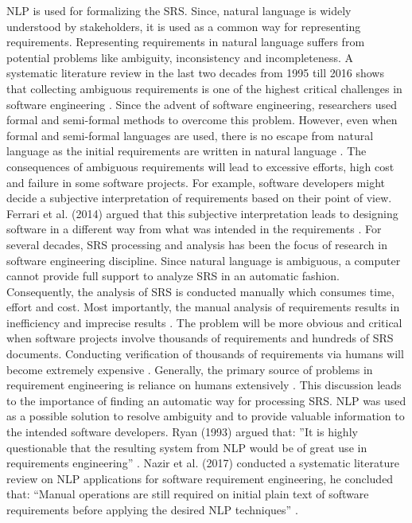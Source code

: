 \gls{NLP} is used for formalizing the \gls{SRS}. Since, natural language is widely understood by stakeholders, it is used as a common way for representing requirements. Representing requirements in natural language suffers from potential problems like ambiguity, inconsistency and incompleteness. A systematic literature review in the last two decades from 1995 till 2016 shows that collecting ambiguous requirements is one of the highest critical challenges in software engineering \cite{Besrour}. Since the advent of software engineering, researchers used formal and semi-formal methods to overcome this problem. However, even when formal and semi-formal languages are used, there is no escape from natural language as the initial requirements are written in natural language \cite{Kamsties}. The consequences of ambiguous requirements will lead to excessive efforts, high cost and failure in some software projects. For example, software developers might decide a subjective interpretation of requirements based on their point of view. Ferrari et al. (2014) argued that this subjective interpretation leads to designing software in a different way from what was intended in the requirements \cite{Ferrari}. For several decades, \gls{SRS} processing and analysis has been the focus of research in software engineering discipline. Since natural language is ambiguous, a computer cannot provide full support to analyze \gls{SRS} in an automatic fashion. Consequently, the analysis of \gls{SRS} is conducted manually which consumes time, effort and cost. Most importantly, the manual analysis of requirements results in inefficiency and imprecise results \cite{Wang}. The problem will be more obvious and critical when software projects involve thousands of requirements and hundreds of \gls{SRS} documents. Conducting verification of thousands of requirements via humans will become extremely expensive \cite{Fanmuy}. Generally, the primary source of problems in requirement engineering is reliance on humans extensively \cite{Ahmed}. This discussion leads to the importance of finding an automatic way for processing \gls{SRS}. \gls{NLP} was used as a possible solution to resolve ambiguity and to provide valuable information to the intended software developers. Ryan (1993) argued that: ”It is highly questionable that the resulting system from \gls{NLP} would be of great use in requirements engineering” \cite{Ryan}. Nazir et al. (2017) conducted a systematic literature review on \gls{NLP} applications for software requirement engineering, he concluded that: “Manual operations are still required on initial plain text of software requirements before applying the desired \gls{NLP} techniques” \cite{Nazir}.

